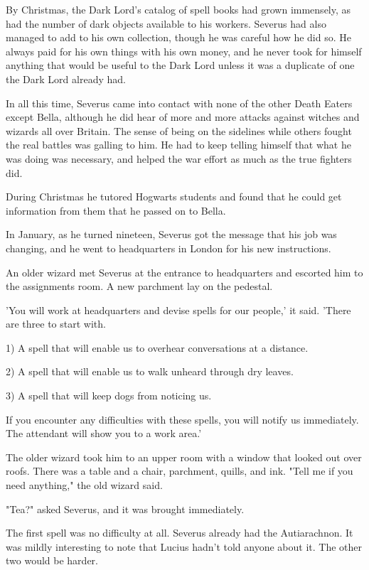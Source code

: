 \documentclass[a4paper,11pt]{article}
\begin{document}
By Christmas, the Dark Lord's catalog of spell books had grown immensely, as had the number of dark objects available to his workers. Severus had also managed to add to his own collection, though he was careful how he did so. He always paid for his own things with his own money, and he never took for himself anything that would be useful to the Dark Lord unless it was a duplicate of one the Dark Lord already had.

In all this time, Severus came into contact with none of the other Death Eaters except Bella, although he did hear of more and more attacks against witches and wizards all over Britain. The sense of being on the sidelines while others fought the real battles was galling to him. He had to keep telling himself that what he was doing was necessary, and helped the war effort as much as the true fighters did.

During Christmas he tutored Hogwarts students and found that he could get information from them that he passed on to Bella.

In January, as he turned nineteen, Severus got the message that his job was changing, and he went to headquarters in London for his new instructions.

An older wizard met Severus at the entrance to headquarters and escorted him to the assignments room. A new parchment lay on the pedestal.

'You will work at headquarters and devise spells for our people,' it said. 'There are three to start with.

1) A spell that will enable us to overhear conversations at a distance.

2) A spell that will enable us to walk unheard through dry leaves.

3) A spell that will keep dogs from noticing us.

If you encounter any difficulties with these spells, you will notify us immediately. The attendant will show you to a work area.'

The older wizard took him to an upper room with a window that looked out over roofs. There was a table and a chair, parchment, quills, and ink. "Tell me if you need anything," the old wizard said.

"Tea?" asked Severus, and it was brought immediately.

The first spell was no difficulty at all. Severus already had the Autiarachnon. It was mildly interesting to note that Lucius hadn't told anyone about it. The other two would be harder.
\end{document}
